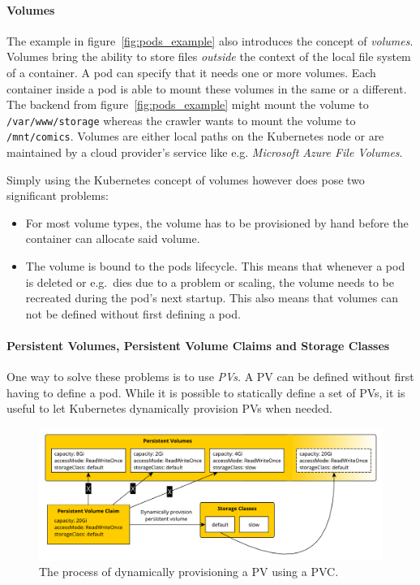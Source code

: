 \paragraph{Volumes}%
\label{par:Volumes}

The example in figure~\ref{fig:pods_example} also introduces the concept of
\textit{volumes}. Volumes bring the ability to store files \textit{outside} the
context of the local file system of a container. A pod can specify that it
needs one or more volumes. Each container inside a pod is able to mount these
volumes in the same or a different. The backend from
figure~\ref{fig:pods_example} might mount the volume to
\texttt{/var/www/storage} whereas the crawler wants to mount the volume to
\texttt{/mnt/comics}. Volumes are either local paths on the Kubernetes node or
are maintained by a cloud provider's service like e.g. \textit{Microsoft Azure
File Volumes}.

Simply using the Kubernetes concept of volumes however does pose two significant problems:
\begin{itemize}
  \item For most volume types, the volume has to be provisioned by hand before
    the container can allocate said volume.
  \item The volume is bound to the pods lifecycle. This means that whenever a
    pod is deleted or e.g.\ dies due to a problem or scaling, the volume needs
    to be recreated during the pod's next startup. This also means that volumes
    can not be defined without first defining a pod.
\end{itemize}

\paragraph{Persistent Volumes, Persistent Volume Claims and Storage Classes}%
\label{par:Persistent_Volume_Claims_and_Storage_Classes}
One way to solve these problems is to use \textit{\acfp{PV}}. A \ac{PV} can be
defined without first having to define a pod. While it is possible to
statically define a set of \acp{PV}, it is useful to let Kubernetes dynamically
provision \acp{PV} when needed.

\begin{figure}[H]
\begin{center}
  \includegraphics[scale=0.5]{images/figures/pvs.pdf}
\end{center}
\caption{The process of dynamically provisioning a \acf{PV} using a \acf{PVC}.}%
\label{fig:dynamic_pvs}
\end{figure}

